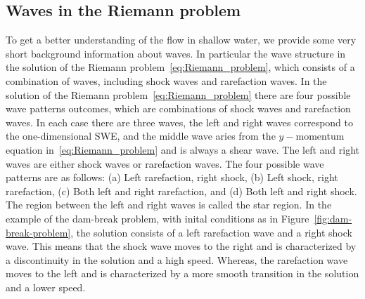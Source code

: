 \subsection{Waves in the Riemann problem}
To get a better understanding of the flow in shallow water, we provide some very short background information about waves.
In particular the wave structure in the solution of the Riemann problem~\eqref{eq:Riemann_problem}, which consists of a combination of waves, including shock waves and rarefaction waves.
In the solution of the Riemann problem~\eqref{eq:Riemann_problem} there are four possible wave patterns outcomes, which are combinations of shock waves and rarefaction waves.
In each case there are three waves, the left and right waves correspond to the one-dimensional SWE, and the middle wave aries from the $y-$momentum equation in~\eqref{eq:Riemann_problem} and is always a shear wave.
The left and right waves are either shock waves or rarefaction waves.
The four possible wave patterns are as follows:
(a) Left rarefaction, right shock, (b) Left shock, right rarefaction, (c) Both left and right rarefaction, and (d) Both left and right shock.
The region between the left and right waves is called the star region.
In the example of the dam-break problem, with inital conditions as in Figure~\ref{fig:dam-break-problem}, the solution consists of a left rarefaction wave and a right shock wave.
This means that the shock wave moves to the right and is characterized by a discontinuity in the solution and a high speed.
Whereas, the rarefaction wave moves to the left and is characterized by a more smooth transition in the solution and a lower speed.

